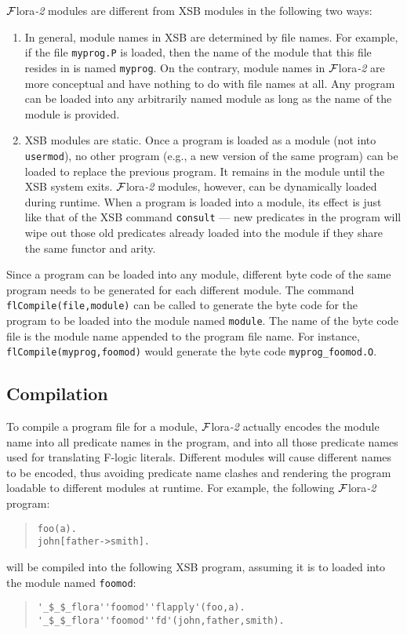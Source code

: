 \documentclass[11pt]{article}
\newcommand{\FLORA}{{\mbox{${\cal F}${\sc lora}\rm\emph{-2}}}\xspace}
\newcommand{\fl}{\mbox{F-logic}\xspace}
\begin{document}
%
\FLORA modules are different from XSB modules in the following two
ways:
\begin{enumerate}
\item In general, module names in XSB are determined by file names.
      For example, if the file {\tt myprog.P} is loaded, then the name
      of the module that this file resides in is named {\tt myprog}.
      On the contrary, module names in \FLORA are more conceptual and
      have nothing to do with file names at all. Any program can be
      loaded into any arbitrarily named module as long as the name of
      the module is provided.

\item XSB modules are static. Once a program is loaded as a module (not
      into {\tt usermod}), no other program (e.g., a new version of
      the same program) can be loaded to replace the previous program.
      It remains in the module until the XSB system exits. \FLORA modules,
      however, can be dynamically loaded during runtime. When a program
      is loaded into a module, its effect is just like that of the XSB
      command {\tt consult} --- new predicates in the program will wipe
      out those old predicates already loaded into the module if they
      share the same functor and arity.
\end{enumerate}

Since a program can be loaded into any module, different byte code of
the same program needs to be generated for each different module.  The
command {\tt flCompile(file,module)} can be called to generate the
byte code for the program to be loaded into the module named
{\tt module}. The name of the byte code file is the module name appended
to the program file name. For instance, {\tt flCompile(myprog,foomod)}
would generate the byte code {\tt myprog\_foomod.O}.


\subsection{Compilation} \label{sec:flora-modules-compilation}


%
To compile a program file for a module, \FLORA actually encodes the
module name into all predicate names in the program, and into all
those predicate names used for translating \fl literals. Different
modules will cause different names to be encoded, thus avoiding
predicate name clashes and rendering the program loadable to different
modules at runtime.  For example, the following \FLORA program:
\begin{quote}
\begin{verbatim}
foo(a).
john[father->smith].
\end{verbatim}
\end{quote}
will be compiled into the following XSB program, assuming it is to
loaded into the module named {\tt foomod}:
\begin{quote}
\begin{verbatim}
'_$_$_flora''foomod''flapply'(foo,a).
'_$_$_flora''foomod''fd'(john,father,smith).
\end{verbatim}
\end{quote}
\end{document}
